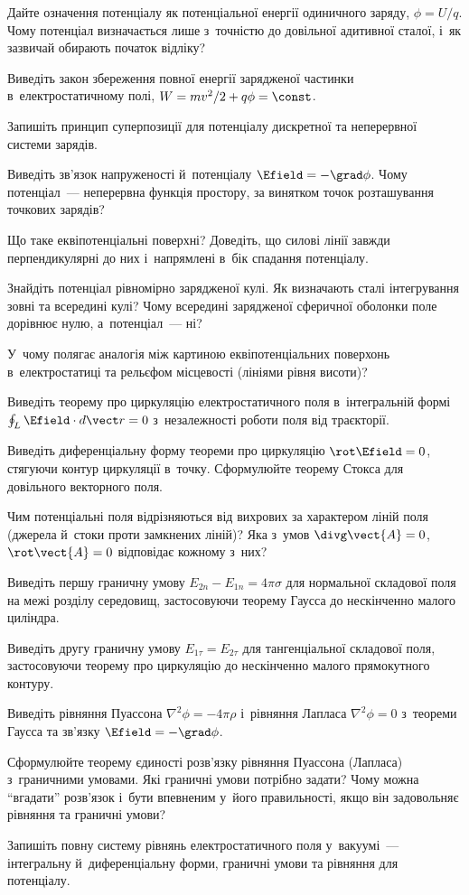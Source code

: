 \begin{Questions}
\begin{quizlist}
		\item Дайте означення потенціалу як потенціальної енергії одиничного заряду,
		$\phi=U/q$. Чому потенціал визначається лише з~точністю до довільної адитивної
		сталої, і~як зазвичай обирають початок відліку?
		\item Виведіть закон збереження повної енергії зарядженої частинки в~електростатичному
		полі, $W=mv^2/2+q\phi=\const$.
		\item Запишіть принцип суперпозиції для потенціалу дискретної та неперервної системи
		зарядів.
		\item Виведіть зв'язок напруженості й~потенціалу $\Efield=-\grad\phi$. Чому
		потенціал~--- неперервна функція простору, за винятком точок розташування точкових
		зарядів?
		\item Що таке еквіпотенціальні поверхні? Доведіть, що силові лінії завжди
		перпендикулярні до них і~напрямлені в~бік спадання потенціалу.
		\item Знайдіть потенціал рівномірно зарядженої кулі. Як визначають сталі інтегрування
		зовні та всередині кулі? Чому всередині зарядженої сферичної оболонки поле дорівнює
		нулю, а~потенціал~--- ні?
		\item У~чому полягає аналогія між картиною еквіпотенціальних поверхонь
		в~електростатиці та рельєфом місцевості (лініями рівня висоти)?
		\item Виведіть теорему про циркуляцію електростатичного поля в~інтегральній формі
		$\oint_L\Efield\cdot d\vect r=0$ з~незалежності роботи поля від траєкторії.
		\item Виведіть диференціальну форму теореми про циркуляцію $\rot\Efield=0$, стягуючи
		контур циркуляції в~точку. Сформулюйте теорему Стокса для довільного векторного
		поля.
		\item Чим потенціальні поля відрізняються від вихрових за характером ліній поля
		(джерела й~стоки проти замкнених ліній)? Яка з~умов $\divg\vect{A} = 0$,
		$\rot\vect{A} = 0$ відповідає кожному з~них?
		\item Виведіть першу граничну умову $E_{2n}-E_{1n}=4\pi\sigma$ для нормальної
		складової поля на межі розділу середовищ, застосовуючи теорему Гаусса до нескінченно
		малого циліндра.
		\item Виведіть другу граничну умову $E_{1\tau}=E_{2\tau}$ для тангенціальної складової
		поля, застосовуючи теорему про циркуляцію до нескінченно малого прямокутного
		контуру.
		\item Виведіть рівняння Пуассона $\nabla^2\phi=-4\pi\rho$ і~рівняння Лапласа
		$\nabla^2\phi=0$ з~теореми Гаусса та зв'язку $\Efield=-\grad\phi$.
		\item Сформулюйте теорему єдиності розв'язку рівняння Пуассона (Лапласа) з~граничними
		умовами. Які граничні умови потрібно задати? Чому можна \enquote{вгадати} розв'язок
		і~бути впевненим у~його правильності, якщо він задовольняє рівняння та граничні
		умови?
		\item Запишіть повну систему рівнянь електростатичного поля у~вакуумі~--- інтегральну
		й~диференціальну форми, граничні умови та рівняння для потенціалу.
	\end{quizlist}
\end{Questions}

